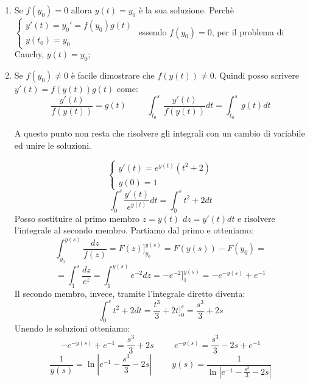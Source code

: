 \begin{enumerate}
    \item Se $f(y_0)=0$ allora $y(t)=y_0$ è la sua soluzione. Perchè $\begin{cases}y'(t)=y_0'=f(y_0)g(t)\\y(t_0)=y_0\end{cases}$ essendo $f(y_0)=0$, per il problema di Cauchy, $y(t)=y_0$;
    
    \item Se $f(y_0)\neq0$ è facile dimostrare che $f(y(t))\neq0$. Quindi posso scrivere $y'(t)=f(y(t))g(t)$ come:
        \begin{equation*}\frac{y'(t)}{f(y(t))}=g(t)\hspace{1cm}\int^s_{t_0}\frac{y'(t)}{f(y(t))}dt=\int^s_{t_0}g(t)dt\end{equation*}
        
        A questo punto non resta che risolvere gli integrali con un cambio di variabile ed unire le soluzioni.
        
        \begin{example}
            \begin{equation*}\begin{cases}y'(t)=e^{y(t)}(t^2+2)\\y(0)=1\end{cases}\end{equation*}
            \begin{equation*}\int^s_0\frac{y'(t)}{e^{y(t)}}dt=\int^s_0t^2+2dt\end{equation*}
            Posso sostituire al primo membro $z=y(t)$ $dz=y'(t)dt$ e risolvere l'integrale al secondo membro. Partiamo dal primo e otteniamo:
            \begin{equation*}\int^{y(s)}_{y_0}\frac{dz}{f(z)}=F(z)]^{y(s)}_{y_0}=F(y(s))-F(y_0)=\end{equation*}
            \begin{equation*}=\int^s_1\frac{dz}{e^z}=\int^{y(s)}_{1}e^{-2}dz=-e^{-2}]^{y(s)}_{1}=-e^{-y(s)}+e^{-1}\end{equation*}
            Il secondo membro, invece, tramite l'integrale diretto diventa:
            \begin{equation*}\int^s_0t^2+2dt=\frac{t^3}{3}+2t]^s_0=\frac{s^3}{3}+2s\end{equation*}
            Unendo le soluzioni otteniamo:
            \begin{equation*}-e^{-y(s)}+e^{-1}=\frac{s^3}{3}+2s\hspace{1cm}e^{-y(s)}=\frac{s^3}{3}-2s+e^{-1}\end{equation*}
            \begin{equation*}\frac{1}{y(s)}=\ln|e^{-1}-\frac{s^3}{3}-2s|\hspace{1cm}y(s)=\frac{1}{\ln|e^{-1}-\frac{s^3}{3}-2s|}\end{equation*}
            
        \end{example}
\end{enumerate}

